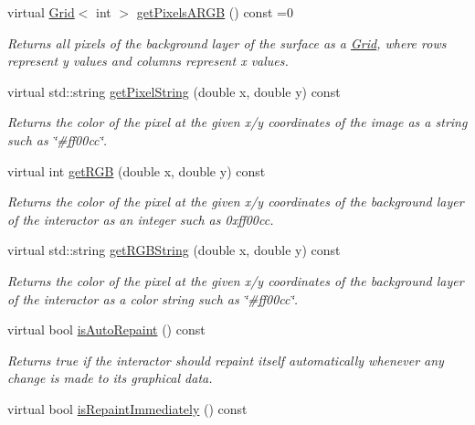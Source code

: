 \begin{DoxyCompactItemize}
virtual \mbox{\hyperlink{classGrid}{Grid}}$<$ int $>$ \mbox{\hyperlink{classGDrawingSurface_a5712954f3edce2e1e4dd3109ffe16e05}{get\+Pixels\+A\+R\+GB}} () const =0
\begin{DoxyCompactList}\small\item\em Returns all pixels of the background layer of the surface as a \mbox{\hyperlink{classGrid}{Grid}}, where rows represent y values and columns represent x values. \end{DoxyCompactList}\item 
virtual std\+::string \mbox{\hyperlink{classGDrawingSurface_a8da04ef488ec5fa498fbbffaf50928fd}{get\+Pixel\+String}} (double x, double y) const
\begin{DoxyCompactList}\small\item\em Returns the color of the pixel at the given x/y coordinates of the image as a string such as \char`\"{}\#ff00cc\char`\"{}. \end{DoxyCompactList}\item 
virtual int \mbox{\hyperlink{classGDrawingSurface_a9e983467cf0c97cfd62433a8471570dc}{get\+R\+GB}} (double x, double y) const
\begin{DoxyCompactList}\small\item\em Returns the color of the pixel at the given x/y coordinates of the background layer of the interactor as an integer such as 0xff00cc. \end{DoxyCompactList}\item 
virtual std\+::string \mbox{\hyperlink{classGDrawingSurface_a456d3582acc3544f37d939f5cb8802fe}{get\+R\+G\+B\+String}} (double x, double y) const
\begin{DoxyCompactList}\small\item\em Returns the color of the pixel at the given x/y coordinates of the background layer of the interactor as a color string such as \char`\"{}\#ff00cc\char`\"{}. \end{DoxyCompactList}\item 
virtual bool \mbox{\hyperlink{classGDrawingSurface_a12c8d52ddfcaa5448ec4bace92ddee6c}{is\+Auto\+Repaint}} () const
\begin{DoxyCompactList}\small\item\em Returns true if the interactor should repaint itself automatically whenever any change is made to its graphical data. \end{DoxyCompactList}\item 
virtual bool \mbox{\hyperlink{classGDrawingSurface_a82a00267c81cc0ae85ee0feb01a92fa8}{is\+Repaint\+Immediately}} () const

\end{DoxyCompactItemize}
